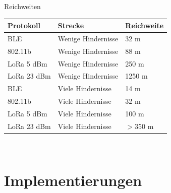 \documentclass[18pt]{beamer}
\begin{document}
\begin{frame}{Reichweiten}
	\centering
	\begin{tabular}{l|l|l}
		Protokoll & Strecke & Reichweite \\
		\hline
		BLE & Wenige Hindernisse & 32 m \\
		802.11b & Wenige Hindernisse & 88 m \\
		LoRa 5 dBm & Wenige Hindernisse & 250 m \\
		LoRa 23 dBm & Wenige Hindernisse & 1250 m \\
		\hline
		\pause
		BLE & Viele Hindernisse & 14 m \\
		802.11b & Viele Hindernisse & 32 m \\
		LoRa 5 dBm & Viele Hindernisse & 100 m \\
		LoRa 23 dBm & Viele Hindernisse & $>$350 m \\
	\end{tabular}\\
\end{frame}

\section{Implementierungen}
\end{document}
